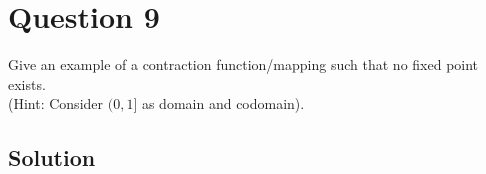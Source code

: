 \section*{Question 9}

Give an example of a contraction function/mapping such that no fixed point exists. \\
(Hint: Consider \( (0,1] \) as domain and codomain).

\subsection*{Solution}
